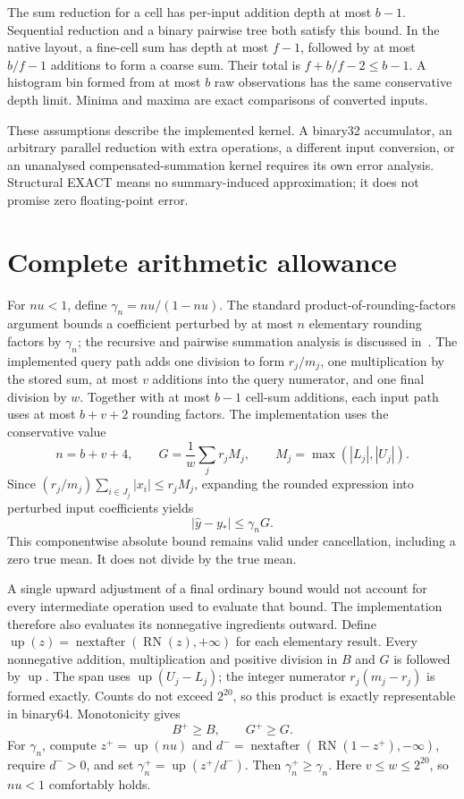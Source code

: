 \documentclass[10pt]{article}
\newcommand{\up}{\operatorname{up}}
\newcommand{\RN}{\operatorname{RN}}
\begin{document}
The sum reduction for a cell has per-input addition depth at most $b-1$. Sequential reduction and a binary pairwise tree both satisfy this bound. In the native layout, a fine-cell sum has depth at most $f-1$, followed by at most $b/f-1$ additions to form a coarse sum. Their total is $f+b/f-2\leq b-1$. A histogram bin formed from at most $b$ raw observations has the same conservative depth limit. Minima and maxima are exact comparisons of converted inputs.

These assumptions describe the implemented kernel. A binary32 accumulator, an arbitrary parallel reduction with extra operations, a different input conversion, or an unanalysed compensated-summation kernel requires its own error analysis. Structural EXACT means no summary-induced approximation; it does not promise zero floating-point error.

\section{Complete arithmetic allowance}
For $nu<1$, define $\gamma_n=nu/(1-nu)$. The standard product-of-rounding-factors argument bounds a coefficient perturbed by at most $n$ elementary rounding factors by $\gamma_n$; the recursive and pairwise summation analysis is discussed in~\cite{higham1993}. The implemented query path adds one division to form $r_j/m_j$, one multiplication by the stored sum, at most $v$ additions into the query numerator, and one final division by $w$. Together with at most $b-1$ cell-sum additions, each input path uses at most $b+v+2$ rounding factors. The implementation uses the conservative value
\begin{equation}
 n=b+v+4,
 \qquad G=\frac1w\sum_jr_jM_j,
 \qquad M_j=\max(|L_j|,|U_j|).
\end{equation}
Since $(r_j/m_j)\sum_{i\in J_j}|x_i|\leq r_jM_j$, expanding the rounded expression into perturbed input coefficients yields
\begin{equation}
 |\widehat y-y_*|\leq\gamma_nG.
 \label{eq:arithmetic}
\end{equation}
This componentwise absolute bound remains valid under cancellation, including a zero true mean. It does not divide by the true mean.

A single upward adjustment of a final ordinary bound would not account for every intermediate operation used to evaluate that bound. The implementation therefore also evaluates its nonnegative ingredients outward. Define $\up(z)=\operatorname{nextafter}(\RN(z),+\infty)$ for each elementary result. Every nonnegative addition, multiplication and positive division in $B$ and $G$ is followed by $\up$. The span uses $\up(U_j-L_j)$; the integer numerator $r_j(m_j-r_j)$ is formed exactly. Counts do not exceed $2^{20}$, so this product is exactly representable in binary64. Monotonicity gives
\begin{equation}
 B^+\geq B,\qquad G^+\geq G.
\end{equation}
For $\gamma_n$, compute $z^+=\up(nu)$ and $d^-=\operatorname{nextafter}(\RN(1-z^+),-\infty)$, require $d^->0$, and set $\gamma_n^+=\up(z^+/d^-)$. Then $\gamma_n^+\geq\gamma_n$. Here $v\leq w\leq2^{20}$, so $nu<1$ comfortably holds.
\end{document}
